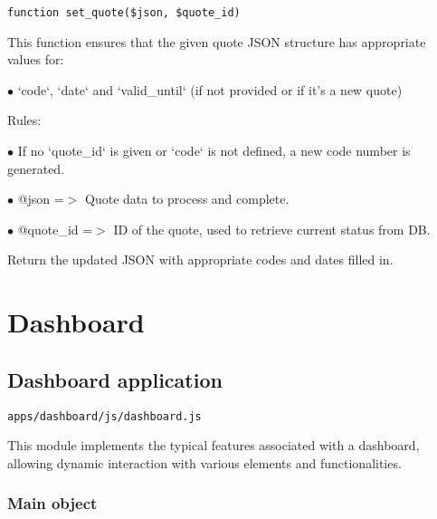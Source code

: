 \documentclass[a4paper]{article}
\begin{document}
\begin{lstlisting}
function set_quote($json, $quote_id)
\end{lstlisting}

This function ensures that the given quote JSON structure has appropriate values for:

\begin{compactitem}
\item[\color{myblue}$\bullet$] `code`, `date` and `valid\_until` (if not provided or if it's a new quote)
\end{compactitem}

Rules:

\begin{compactitem}
\item[\color{myblue}$\bullet$] If no `quote\_id` is given or `code` is not defined, a new code number is generated.
\end{compactitem}

\begin{compactitem}
\item[\color{myblue}$\bullet$] @json     =$>$ Quote data to process and complete.
\item[\color{myblue}$\bullet$] @quote\_id =$>$ ID of the quote, used to retrieve current status from DB.
\end{compactitem}

Return the updated JSON with appropriate codes and dates filled in.


\hypertarget{toc51}{}
\section{Dashboard}

\hypertarget{toc52}{}
\subsection{Dashboard application}

\begin{lstlisting}
apps/dashboard/js/dashboard.js
\end{lstlisting}

This module implements the typical features associated with a dashboard,
allowing dynamic interaction with various elements and functionalities.

\hypertarget{toc53}{}
\subsubsection{Main object}
\end{document}
